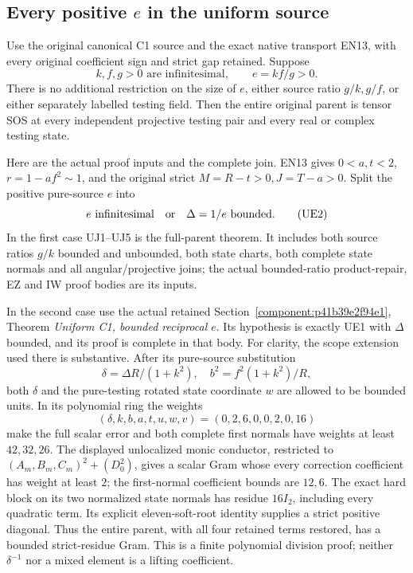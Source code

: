 \subsection{Every positive $e$ in the uniform source}

\label{component:pf5d2f33f694c}

\label{pf5d2f33f694c:sec:uniform-c1-all-e-rederived}

Use the original canonical C1 source and the exact native transport
EN13, with every original coefficient sign and strict gap retained.
Suppose
\[
 k,f,g>0\text{ are infinitesimal},\qquad e=kf/g>0 .
 \tag{UE1}
\]
There is no additional restriction on the size of \(e\), either
source ratio \(g/k,g/f\), or either separately labelled testing field.
Then the entire original parent is tensor SOS at every independent
projective testing pair and every real or complex testing state.

Here are the actual proof inputs and the complete join.  EN13 gives
\(0<a,t<2\), \(r=1-af^2\sim1\), and the original strict
\(M=R-t>0,J=T-a>0\).  Split the positive pure-source \(e\) into
\[
 e\text{ infinitesimal}\quad\hbox{or}\quad \Delta=1/e\text{ bounded}.
 \tag{UE2}
\]
In the first case UJ1--UJ5 is the full-parent theorem.  It
includes both source ratios \(g/k\) bounded and unbounded, both
state charts, both complete state normals and all angular/projective
joins; the actual bounded-ratio product-repair, EZ and IW proof bodies are its inputs.

In the second case use the actual retained
Section~\ref{component:p41b39e2f94e1}, Theorem \emph{Uniform C1, bounded
reciprocal \(e\)}.  Its hypothesis is exactly UE1 with
\(\Delta\) bounded, and its proof is complete in that body.
For clarity, the scope extension used there is substantive.
After its pure-source substitution
\[
 \delta=\Delta R/(1+k^2),\quad b^2=f^2(1+k^2)/R,
\]
both \(\delta\) and the pure-testing rotated state coordinate \(w\)
are allowed to be bounded units.  In its polynomial ring the weights
\[
 (\delta,k,b,a,t,u,w,v)=(0,2,6,0,0,2,0,16)
 \tag{UE3}
\]
make the full scalar error and both complete first normals have weights
at least \(42,32,26\).  The displayed unlocalized monic conductor,
restricted to \((A_m,B_m,C_m)^2+(D_0^2)\), gives a scalar Gram
whose every correction coefficient has weight at least \(2\);
the first-normal coefficient bounds are \(12,6\).
The exact hard block on its two normalized state normals has
residue \(16I_2\), including every quadratic term.  Its explicit
eleven-soft-root identity supplies a strict positive diagonal.
Thus the entire parent, with all four retained terms restored,
has a bounded strict-residue Gram.  This is a finite polynomial
division proof; neither \(\delta^{-1}\) nor a mixed element is a
lifting coefficient.

